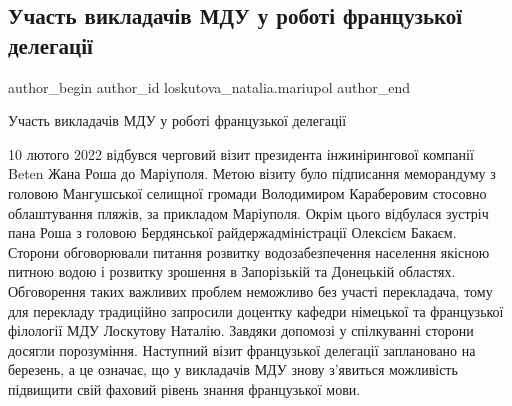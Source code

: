  
 
 
 
 

\subsection{Участь викладачів МДУ у роботі французької делегації}
\label{sec:11_02_2022.fb.loskutova_natalia.mariupol.1.uchast_vikladach_v_m}

\ifcmt
 author_begin
   author_id loskutova_natalia.mariupol
 author_end
\fi

Участь викладачів МДУ у роботі французької делегації

10 лютого 2022 відбувся черговий візит президента інжинірингової компанії Beten
Жана Роша до Маріуполя. Метою візиту було підписання меморандуму з головою
Мангушської селищної громади Володимиром Караберовим стосовно облаштування
пляжів, за прикладом Маріуполя. Окрім цього відбулася зустріч пана Роша з
головою Бердянської райдержадміністрації Олексієм Бакаєм. Сторони обговорювали
питання розвитку водозабезпечення населення якісною питною водою і розвитку
зрошення в Запорізькій та Донецькій областях. Обговорення таких важливих
проблем неможливо без участі перекладача, тому для перекладу традиційно
запросили доцентку кафедри німецької та французької філології МДУ Лоскутову
Наталію. Завдяки допомозі у спілкуванні сторони досягли порозуміння. Наступний
візит французької делегації заплановано на березень, а це означає, що у
викладачів МДУ знову з'явиться можливість підвищити свій фаховий рівень знання
французької мови.
